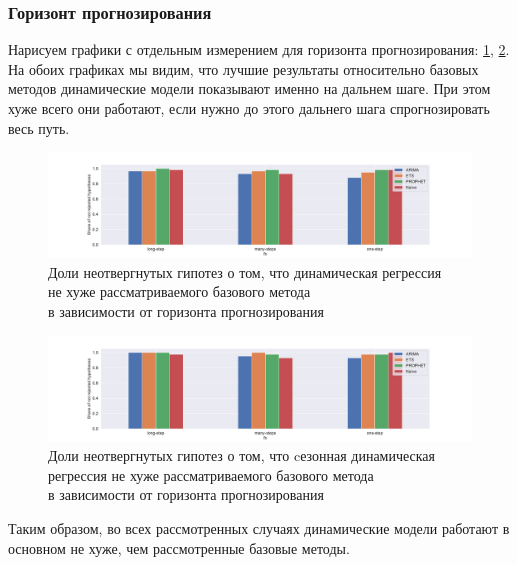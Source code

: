 \documentclass[a4paper,14pt]{extarticle}
\begin{document}
	\subsubsection{Горизонт прогнозирования}
	Нарисуем графики с отдельным измерением для горизонта прогнозирования: \ref{results:dynreg:fh}, \ref{results:seasdynreg:fh}. На обоих графиках мы видим, что лучшие результаты относительно базовых методов динамические модели показывают именно на дальнем шаге. При этом хуже всего они работают, если нужно до этого дальнего шага спрогнозировать весь путь. 
	\begin{figure}[!h]
		\captionsetup{justification=centering}
		\centering
		\includegraphics[width=\linewidth]{pictures/results-dynreg-fh.pdf}
		\caption{Доли неотвергнутых гипотез о том, что динамическая регрессия \\ не хуже рассматриваемого базового метода \\ в зависимости от горизонта прогнозирования}
		\label{results:dynreg:fh}
	\end{figure}
	\begin{figure}[!h]
		\captionsetup{justification=centering}
		\centering
		\includegraphics[width=\linewidth]{pictures/results-seasdynreg-fh.pdf}
		\caption{Доли неотвергнутых гипотез о том, что cезонная динамическая регрессия не хуже рассматриваемого базового метода \\ в зависимости от горизонта прогнозирования}
		\label{results:seasdynreg:fh}
	\end{figure}

	\newpage
	\newpage

	Таким образом, во всех рассмотренных случаях динамические модели работают в основном не хуже, чем рассмотренные базовые методы. 
\end{document}
